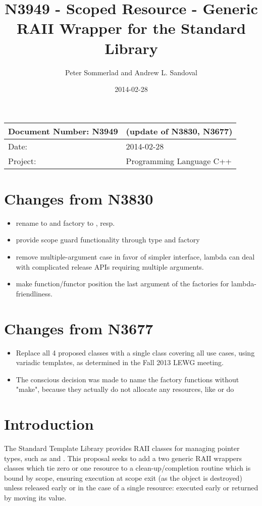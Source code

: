\documentclass[ebook,11pt,article]{memoir}
\title{N3949 - Scoped Resource - Generic RAII Wrapper for the Standard Library}
\author{Peter Sommerlad and Andrew L. Sandoval}
\date{2014-02-28}                                           %
\begin{document}
\maketitle
\begin{tabular}[t]{|l|l|}\hline 
Document Number: N3949 &   (update of N3830, N3677)\\\hline
Date: & 2014-02-28 \\\hline
Project: & Programming Language C++\\\hline 
\end{tabular}

\chapter{Changes from N3830}
\begin{itemize}
\item rename to  and factory to , resp. 
\item provide scope guard functionality through type  and  factory
\item remove multiple-argument case in favor of simpler interface, lambda can deal with complicated release APIs requiring multiple arguments.
\item make function/functor position the last argument of the factories for lambda-friendliness.

\end{itemize}
\chapter{Changes from N3677}
\begin{itemize}
\item Replace all 4 proposed classes with a single class covering all use cases, using variadic templates, as determined in the Fall 2013 LEWG meeting.
\item The conscious decision was made to name the factory functions without "make", because they actually do not allocate any resources, like  or  do
\end{itemize}

\chapter{Introduction}
The Standard Template Library provides RAII classes for managing pointer types, such as  and .  This proposal seeks to add a two generic RAII wrappers classes which tie zero or one resource to a clean-up/completion routine which is bound by scope, ensuring execution at scope exit (as the object is destroyed) unless released early or in the case of a single resource: executed early or returned by moving its value.
\end{document}
